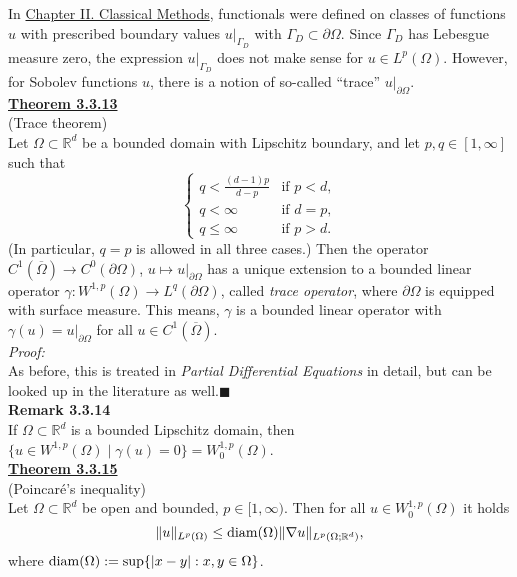 In \hyperref[chap:mcov_chap2]{Chapter II. Classical Methods}, functionals were defined on classes of functions $u$ with prescribed boundary values $u|_{\Gamma_D}$ with $\Gamma_D\subset\partial\Omega$. Since $\Gamma_D$ has Lebesgue measure zero, the expression $u|_{\Gamma_D}$ does not make sense for $u\in L^p(\Omega)$. However, for Sobolev functions $u$, there is a notion of so-called ``trace'' $u|_{\partial\Omega}$.\\

\textbf{\underline{Theorem 3.3.13}}\\
(Trace theorem)\\
Let $\Omega\subset\mathbb{R}^d$ be a bounded domain with Lipschitz boundary, and let $p,q\in[1,\infty]$ such that
\[\left\{\begin{array}{rl}
	q<\frac{(d-1)p}{d-p}&\text{if }p<d,\\
	q<\infty&\text{if }d=p,\\
	q\leq\infty&\text{if }p>d.
\end{array}\right.\]
(In particular, $q=p$ is allowed in all three cases.) Then the operator $C^1(\overline{\Omega})\longrightarrow C^0(\partial\Omega)$, $u\longmapsto u|_{\partial\Omega}$ has a unique extension to a bounded linear operator $\gamma:W^{1,p}(\Omega)\longrightarrow L^q(\partial\Omega)$, called \textit{trace operator}, where $\partial\Omega$ is equipped with surface measure. This means, $\gamma$ is a bounded linear operator with $\gamma(u)=u|_{\partial\Omega}$ for all $u\in C^1(\overline{\Omega})$.\\

\textit{Proof:}\\
As before, this is treated in \textit{Partial Differential Equations} in detail, but can be looked up in the literature as well.\hfill$\blacksquare$\\[11pt]

\textbf{Remark 3.3.14}\\
If $\Omega\subset\mathbb{R}^d$ is a bounded Lipschitz domain, then $\{u\in W^{1,p}(\Omega)\mid\gamma(u)=0\}=W_0^{1,p}(\Omega)$.\\[11pt]

\textbf{\underline{Theorem 3.3.15}}\\
(Poincar\'e's inequality)\\
Let $\Omega\subset\mathbb{R}^d$ be open and bounded, $p\in[1,\infty)$. Then for all $u\in W_0^{1,p}(\Omega)$ it holds
\[\lVert u\rVert_{L^p(\Omega)}\leq\operatorname{diam}\mathopen{}\left(\Omega\right)\mathclose{}\lVert\nabla u\rVert_{L^p(\Omega;\mathbb{R}^d)},\]
where $\operatorname{diam}\mathopen{}\left(\Omega\right)\mathclose{}:=\sup\{\lvert x-y\rvert:x,y\in\Omega\}$.\\

